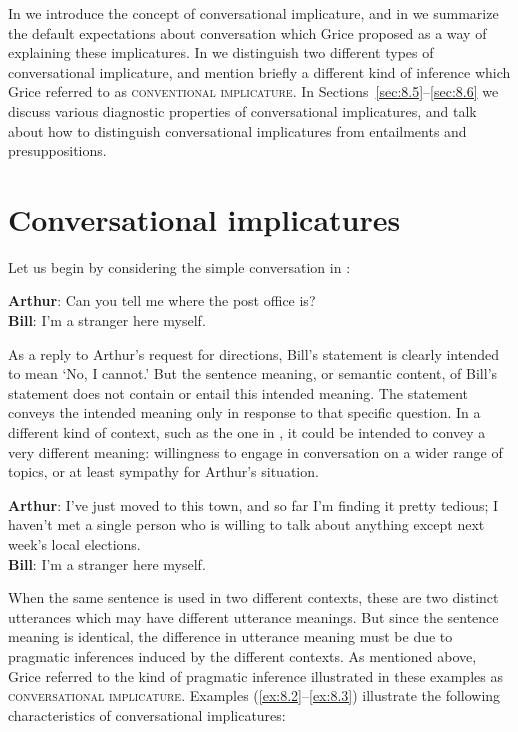 In  we introduce the concept of conversational implicature, and in  we summarize the default expectations about conversation which Grice proposed as a way of explaining these implicatures. In  we distinguish two different types of conversational implicature, and mention briefly a different kind of inference which Grice referred to as \textsc{conventional implicature}. In Sections~\ref{sec:8.5}--\ref{sec:8.6} we discuss various diagnostic properties of conversational implicatures, and talk about how to distinguish conversational implicatures from entailments and presuppositions.


\section{Conversational implicatures}\label{sec:8.2}

Let us begin by considering the simple conversation in : 


\ea \label{ex:8.2}
\textbf{Arthur}: Can you tell me where the post office is?\\
\textbf{Bill}: I’m a stranger here myself.
\z


As a reply to Arthur’s request for directions, Bill’s statement is clearly intended to mean ‘No, I cannot.’ But the sentence meaning, or semantic content, of Bill’s statement does not contain or entail this intended meaning. The statement conveys the intended meaning only in response to that specific question. In a different kind of context, such as the one in , it could be intended to convey a very different meaning: willingness to engage in conversation on a wider range of topics, or at least sympathy for Arthur’s situation.


\ea \label{ex:8.3}
\textbf{Arthur}: I’ve just moved to this town, and so far I’m finding it pretty tedious; I haven’t met a single person who is willing to talk about anything except next week’s local elections.\\
\textbf{Bill}: I’m a stranger here myself.
\z


When the same sentence is used in two different contexts, these are two distinct utterances which may have different utterance meanings. But since the sentence meaning is identical, the difference in utterance meaning must be due to pragmatic inferences induced by the different contexts. As mentioned above, Grice referred to the kind of pragmatic inference illustrated in these examples as \textsc{conversational implicature}. Examples (\ref{ex:8.2}--\ref{ex:8.3}) illustrate the following characteristics of conversational implicatures:


